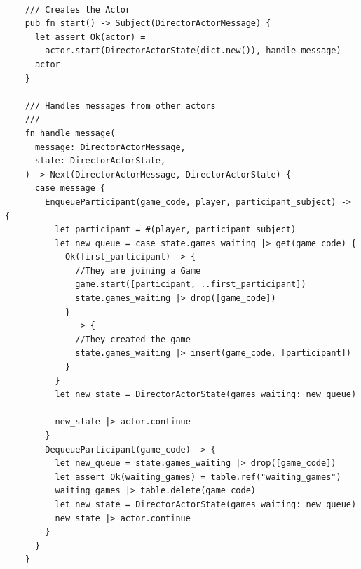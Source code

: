 \documentclass[]{final}
\begin{document}
\begin{minipage}[t]{20em}
  \begin{lstlisting}[language=gleam]

    /// Creates the Actor
    pub fn start() -> Subject(DirectorActorMessage) {
      let assert Ok(actor) =
        actor.start(DirectorActorState(dict.new()), handle_message)
      actor
    }

    /// Handles messages from other actors
    ///
    fn handle_message(
      message: DirectorActorMessage,
      state: DirectorActorState,
    ) -> Next(DirectorActorMessage, DirectorActorState) {
      case message {
        EnqueueParticipant(game_code, player, participant_subject) -> {
          let participant = #(player, participant_subject)
          let new_queue = case state.games_waiting |> get(game_code) {
            Ok(first_participant) -> {
              //They are joining a Game
              game.start([participant, ..first_participant])
              state.games_waiting |> drop([game_code])
            }
            _ -> {
              //They created the game
              state.games_waiting |> insert(game_code, [participant])
            }
          }
          let new_state = DirectorActorState(games_waiting: new_queue)

          new_state |> actor.continue
        }
        DequeueParticipant(game_code) -> {
          let new_queue = state.games_waiting |> drop([game_code])
          let assert Ok(waiting_games) = table.ref("waiting_games")
          waiting_games |> table.delete(game_code)
          let new_state = DirectorActorState(games_waiting: new_queue)
          new_state |> actor.continue
        }
      }
    }

      \end{lstlisting}
  \label{fig: 6}
\end{minipage}

\newpage
\end{document}
